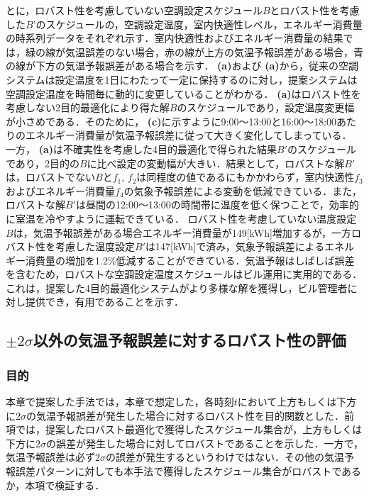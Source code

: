 とに，ロバスト性を考慮していない空調設定スケジュール$B$とロバスト性を考慮した$B’$のスケジュールの，空調設定温度，室内快適性レベル，エネルギー消費量の時系列データをそれぞれ示す．室内快適性およびエネルギー消費量の結果では，緑の線が気温誤差のない場合，赤の線が上方の気温予報誤差がある場合，青の線が下方の気温予報誤差がある場合を示す． {\bf (a)}および {\bf (a)}から，従来の空調システムは設定温度を1日にわたって一定に保持するのに対し，提案システムは空調設定温度を時間毎に動的に変更していることがわかる． {\bf (a)}はロバスト性を考慮しない2目的最適化により得た解$B$のスケジュールであり，設定温度変更幅が小さめである．そのために， {\bf (c)}に示すように9:00～13:00と16:00～18:00あたりのエネルギー消費量が気温予報誤差に従って大きく変化してしまっている．
一方， {\bf (a)}は不確実性を考慮した4目的最適化で得られた結果$B'$のスケジュールであり，2目的の$B$に比べ設定の変動幅が大きい．結果として，ロバストな解$B'$は，ロバストでない$B$と$f_1$, $f_2$は同程度の値であるにもかかわらず，室内快適性$f_3$およびエネルギー消費量$f_4$の気象予報誤差による変動を低減できている．また，ロバストな解$B'$は昼間の12:00～13:00の時間帯に温度を低く保つことで，効率的に室温を冷やすように運転できている．
ロバスト性を考慮していない温度設定$B$は，気温予報誤差がある場合エネルギー消費量が149[kWh]増加するが，一方ロバスト性を考慮した温度設定$B'$は147[kWh]で済み，気象予報誤差によるエネルギー消費量の増加を1.2\%低減することができている．気温予報はしばしば誤差を含むため，ロバストな空調設定温度スケジュールはビル運用に実用的である．これは，提案した4目的最適化システムがより多様な解を獲得し，ビル管理者に対し提供でき，有用であることを示す．

\subsection{$\pm 2\sigma$以外の気温予報誤差に対するロバスト性の評価}
\subsubsection{目的}
本章で提案した手法では，本章で想定した，各時刻$t$において上方もしくは下方に$2\sigma$の気温予報誤差が発生した場合に対するロバスト性を目的関数とした．前項では，提案したロバスト最適化で獲得したスケジュール集合が，上方もしくは下方に$2\sigma$の誤差が発生した場合に対してロバストであることを示した．一方で，気温予報誤差は必ず$2\sigma$の誤差が発生するというわけではない．その他の気温予報誤差パターンに対しても本手法で獲得したスケジュール集合がロバストであるか，本項で検証する．

